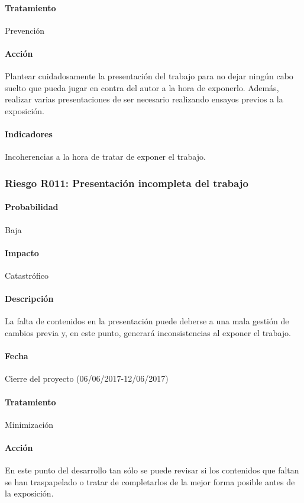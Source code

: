 \documentclass[10pt,a4paper]{article}
\begin{document}
				\paragraph{Tratamiento} Prevención
				\paragraph{Acción} Plantear cuidadosamente la presentación del trabajo para no dejar ningún cabo suelto que pueda jugar en contra del autor a la hora de exponerlo. Además, realizar varias presentaciones de ser necesario realizando ensayos previos a la exposición.
				\paragraph{Indicadores} Incoherencias a la hora de tratar de exponer el trabajo.					

			\subsubsection{Riesgo R011: Presentación incompleta del trabajo}
				\paragraph{Probabilidad} Baja
				\paragraph{Impacto}	Catastrófico
				\paragraph{Descripción} La falta de contenidos en la presentación puede deberse a una mala gestión de cambios previa y, en este punto, generará inconsistencias al exponer el trabajo.
				\paragraph{Fecha} Cierre del proyecto (06/06/2017-12/06/2017)
				\paragraph{Tratamiento} Minimización
				\paragraph{Acción} En este punto del desarrollo tan sólo se puede revisar si los contenidos que faltan se han traspapelado o tratar de completarlos de la mejor forma posible antes de la exposición.
\end{document}
